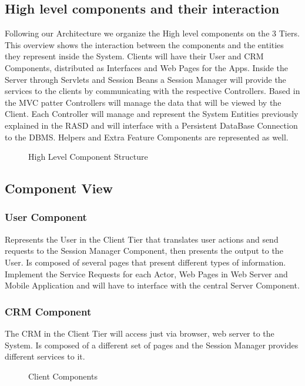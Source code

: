 \documentclass[a4paper]{article}
\begin{document}
\subsection{High level components and their interaction}
Following our Architecture we organize the High level components on the 3 Tiers. This overview shows the interaction between the components and the entities they represent inside the System. Clients will have their User and CRM Components, distributed as Interfaces and Web Pages for the Apps. Inside the Server through Servlets and Session Beans a Session Manager will provide the services to the clients by communicating with the respective Controllers. Based in the MVC patter Controllers will manage the data that will be viewed by the Client. Each Controller will manage and represent the System Entities previously explained in the RASD and will interface with a Persistent DataBase Connection to the DBMS. Helpers and Extra Feature Components are represented as well.

\begin{figure}[h]
\centering
\vspace*{\fill}
\noindent{}%
\caption {High Level Component Structure}
\vspace*{0.5cm}
\end{figure}

\subsection{Component View}
\subsubsection{User Component}
Represents the User in the Client Tier that translates user actions and send requests to the Session Manager Component, then presents the output to the User. Is composed of several pages that present different types of information. Implement the Service Requests for each Actor, Web Pages in Web Server and Mobile Application and will have to interface with the central Server Component.
\subsubsection{CRM Component}
The CRM in the Client Tier will access just via browser, web server to the System. Is composed of a different set of pages and the Session Manager provides different services to it.
\begin{figure}[h]
\centering
\vspace*{\fill}
\noindent{}%
\caption {Client Components}
\vspace*{0.5cm}
\end{figure}
\end{document}
